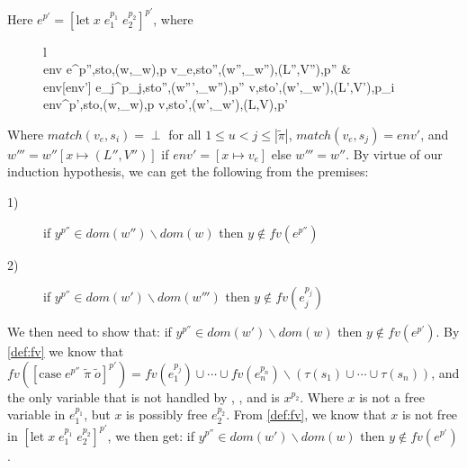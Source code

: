 \item[\runa{Case}] Here $e^{p'}=[\mbox{let}\;x\;e_1^{p_1}\;e_2^{p_2}]^{p'}$, where
\begin{figure}[H]
	\setlength\tabcolsep{8pt}
	\begin{tabular}{l}
		\runa{Case}\\[0.2cm]
			\inference[]
				{env \vdash \left\langle e^{p''},sto,(w,\sqsubseteq_w),p \right\rangle \rightarrow \left\langle v_e,sto'',(w'',\sqsubseteq_w''),(L'',V''),p'' \right\rangle &\\
				env[env'] \vdash \left\langle e_j^{p_j},sto'',(w''',\sqsubseteq_w''),p'' \right\rangle \rightarrow \left\langle v,sto',(w',\sqsubseteq_w'),(L',V'),p_i \right\rangle}
				{env\vdash \left\langle \left[\mbox{case}\;e^{p''}\;\tilde{\pi}\;\tilde{o}\right]^{p'},sto,(w,\sqsubseteq_w),p \right\rangle \rightarrow \left\langle v,sto',(w',\sqsubseteq_w'),(L,V),p' \right\rangle}
	\end{tabular}
\end{figure}
Where $match(v_e,s_i)=\perp$ for all $1\leq u<j\leq|\tilde{\pi}|$, 
$match(v_e,s_j)=env'$, and $w'''=w''[x\mapsto(L'',V'')]$ if $env'=[x\mapsto v_e]$ else $w'''=w''$.
By virtue of our induction hypothesis, we can get the following from the premises:
\begin{description}
	\item[1)] if $y^{p''}\in dom(w'')\backslash dom(w)$ then $y\notin fv(e^{p''})$
	\item[2)] if $y^{p''}\in dom(w')\backslash dom(w''')$ then $y\notin fv(e_j^{p_j})$
\end{description}
We then need to show that: if $y^{p''}\in dom(w')\backslash dom(w)$ then $y\notin fv(e^{p'})$.
By \cref{def:fv} we know that $fv([\mbox{case}\;e^{p''}\;\tilde{\pi}\;\tilde{o}]^{p'})=fv(e_1^{p_j})\cup\cdots\cup fv(e_n^{p_n})\backslash(\tau(s_1)\cup\cdots\cup\tau(s_n))$, and the only variable that is not handled by , , and  is $x^{p_2}$.
Where $x$ is not a free variable in $e_1^{p_1}$, but $x$ is possibly free $e_2^{p_2}$.
From \cref{def:fv}, we know that $x$ is not free in $[\mbox{let}\;x\;e_1^{p_1}\;e_2^{p_2}]^{p'}$, we then get: if $y^{p''}\in dom(w')\backslash dom(w)$ then $y\notin fv(e^{p'})$.
